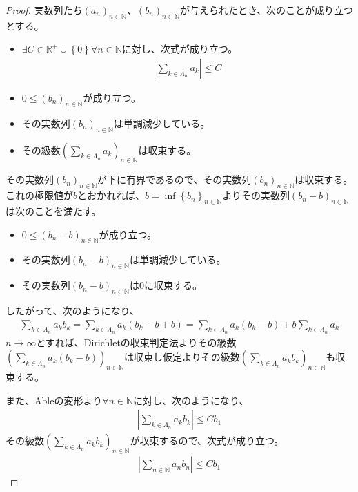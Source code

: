 \documentclass[dvipdfmx]{jsarticle}
\begin{document}
\begin{proof}
実数列たち$\left( a_{n} \right)_{n \in \mathbb{N}}$、$\left( b_{n} \right)_{n \in \mathbb{N}}$が与えられたとき、次のことが成り立つとする。
\begin{itemize}
\item
  $\exists C \in \mathbb{R}^{+} \cup \left\{ 0 \right\}\forall n \in \mathbb{N}$に対し、次式が成り立つ。
\begin{align*}
\left| \sum_{k \in \varLambda_{n}} a_{k} \right| \leq C
\end{align*}
\item
  $0 \leq \left( b_{n} \right)_{n \in \mathbb{N}}$が成り立つ。
\item
  その実数列$\left( b_{n} \right)_{n \in \mathbb{N}}$は単調減少している。
\item
  その級数$\left( \sum_{k \in \varLambda_{n}} a_{k} \right)_{n \in \mathbb{N}}$は収束する。
\end{itemize}
その実数列$\left( b_{n} \right)_{n \in \mathbb{N}}$が下に有界であるので、その実数列$\left( b_{n} \right)_{n \in \mathbb{N}}$は収束する。これの極限値が$b$とおかれれば、$b = \inf\left\{ b_{n} \right\}_{n \in \mathbb{N}}$よりその実数列$\left( b_{n} - b \right)_{n \in \mathbb{N}}$は次のことを満たす。
\begin{itemize}
\item
  $0 \leq \left( b_{n} - b \right)_{n \in \mathbb{N}}$が成り立つ。
\item
  その実数列$\left( b_{n} - b \right)_{n \in \mathbb{N}}$は単調減少している。
\item
  その実数列$\left( b_{n} - b \right)_{n \in \mathbb{N}}$は$0$に収束する。
\end{itemize}
したがって、次のようになり、
\begin{align*}
\sum_{k \in \varLambda_{n}} {a_{k}b_{k}} = \sum_{k \in \varLambda_{n}} {a_{k}\left( b_{k} - b + b \right)} = \sum_{k \in \varLambda_{n}} {a_{k}\left( b_{k} - b \right)} + b\sum_{k \in \varLambda_{n}} a_{k}
\end{align*}
$n \rightarrow \infty$とすれば、Dirichletの収束判定法よりその級数$\left( \sum_{k \in \varLambda_{n}} {a_{k}\left( b_{k} - b \right)} \right)_{n \in \mathbb{N}}$は収束し仮定よりその級数$\left( \sum_{k \in \varLambda_{n}} {a_{k}b_{k}} \right)_{n \in \mathbb{N}}$も収束する。\par
また、Ableの変形より$\forall n \in \mathbb{N}$に対し、次のようになり、
\begin{align*}
\left| \sum_{k \in \varLambda_{n}} {a_{k}b_{k}} \right| \leq Cb_{1}
\end{align*}
その級数$\left( \sum_{k \in \varLambda_{n}} {a_{k}b_{k}} \right)_{n \in \mathbb{N}}$が収束するので、次式が成り立つ。
\begin{align*}
\left| \sum_{n \in \mathbb{N}} {a_{n}b_{n}} \right| \leq Cb_{1}
\end{align*}
\end{proof}
\end{document}
